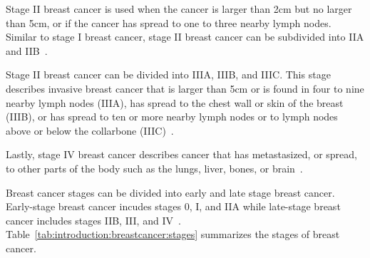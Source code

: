Stage II breast cancer is used when the cancer is larger than 2cm but no larger than 5cm, or if the cancer has spread to one to three nearby lymph nodes. Similar to stage I breast cancer, stage II breast cancer can be subdivided into IIA and IIB~\cite{RefWorks:RefID:151-2025breast}.

Stage II breast cancer can be divided into IIIA, IIIB, and IIIC. This stage describes invasive breast cancer that is larger than 5cm or is found in four to nine nearby lymph nodes (IIIA), has spread to the chest wall or skin of the breast (IIIB), or has spread to ten or more nearby lymph nodes or to lymph nodes above or below the collarbone (IIIC)~\cite{RefWorks:RefID:151-2025breast}.

Lastly, stage IV breast cancer describes cancer that has metastasized, or spread, to other parts of the body such as the lungs, liver, bones, or brain~\cite{RefWorks:RefID:151-2025breast}.

Breast cancer stages can be divided into early and late stage breast cancer. Early-stage breast cancer incudes stages 0, I, and IIA while late-stage breast cancer includes stages IIB, III, and IV~\cite{RefWorks:RefID:365-stages}. Table~\ref{tab:introduction:breastcancer:stages} summarizes the stages of breast cancer.

